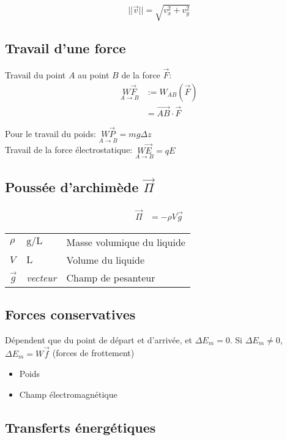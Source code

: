 \documentclass{article}
\newcommand{\vect}{\overrightarrow}
\newcommand{\deftable}[2]{%
\begin{table}[h]
    \centering
    \begin{tabular}{llp{100mm}}%
        #1
    \end{tabular}
    \label{tab:#2_units}
\end{table}%
}
\newcommand{\deftablevar}[3]{%
    $#1$ & $\si{#2}$ & #3 \\
}
\newcommand{\deftableobj}[3]{%
    $#1$ & \textit{#2} & #3 \\
}
\begin{document}
$$||\vec v|| = \sqrt{v_x^2 + v_y^2}$$

\subsection{Travail d'une force}

Travail du point $A$ au point $B$ de la force $\vec F$:
\begin{equation*}
    \begin{split}
        \underset{A\to B}{W\vec F} &:=  W_{AB}(\vec F) \\
            &= \vect{AB} \cdot \vec F
    \end{split}
\end{equation*}

Pour le travail du poids: $\underset{A\to B}{W\vec P} = mg\Delta z$\\
Travail de la force électrostatique: $\underset{A\to B}{W\vec E} = qE$

\subsection{Poussée d'archimède $\vec \Pi$}
\begin{equation*}
    \begin{split}
        \vec \Pi &= -\rho V \vec g
    \end{split}
\end{equation*}
\deftable{
    \deftablevar{\rho}{\gram\per\liter}{Masse volumique du liquide}
    \deftablevar{V}{\liter}{Volume du liquide}
    \deftableobj{\vec g}{vecteur}{Champ de pesanteur}
}{}

\subsection{Forces conservatives}

Dépendent que du point de départ et d'arrivée, et $\Delta E_m = 0$.
Si $\Delta E_m \not= 0$,  $\Delta E_m = W\vec f$ (forces de frottement)

\begin{itemize}
    \item Poids
    \item Champ électromagnétique
\end{itemize}

\subsection{Transferts énergétiques}
\end{document}
